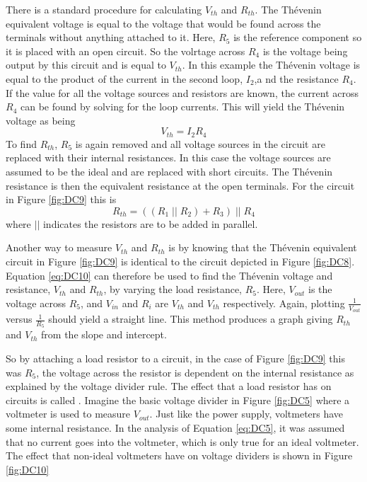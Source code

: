 \documentclass[12pt, a4paper, oneside, openright, titlepage]{book}
\begin{document}
There is a standard procedure for calculating $V_{th}$ and $R_{th}$. The Th\'{e}venin equivalent voltage is equal to the voltage that would be found across the terminals without anything attached to it. Here, $R_5$ is the reference component so it is placed with an open circuit. So the volrtage across $R_4$ is the voltage being output by this circuit and is equal to $V_{th}$. In this example the Th\'{e}venin voltage is equal to the product of the current in the second loop, $I_2$,a nd the resistance $R_4$. If the value for all the voltage sources and resistors are known, the current across $R_4$ can be found by solving for the loop currents. This will yield the Th\'{e}venin voltage as being \begin{equation}\label{eq:DC11}
    V_{th} = I_2R_4
\end{equation}
To find $R_{th}$, $R_5$ is again removed and all voltage sources in the circuit are replaced with their internal resistances. In this case the voltage sources are assumed to be the ideal and are replaced with short circuits. The Th\'{e}venin resistance is then the equivalent resistance at the open terminals. For the circuit in Figure \ref{fig:DC9} this is \begin{equation}\label{eq:DC12}
    R_{th} = ((R_1\;\vert\vert\;R_2)+R_3)\;\vert\vert\;R_4
\end{equation}
where $\vert\vert$ indicates the resistors are to be added in parallel.


\noindent Another way to measure $V_{th}$ and $R_{th}$ is by knowing that the Th\'{e}venin equivalent circuit in Figure \ref{fig:DC9} is identical to the circuit depicted in Figure \ref{fig:DC8}. Equation \ref{eq:DC10} can therefore be used to find the Th\'{e}venin voltage and resistance, $V_{th}$ and $R_{th}$, by varying the load resistance, $R_5$. Here, $V_{out}$ is the voltage across $R_5$, and $V_{in}$ and $R_i$ are $V_{th}$ and $V_{th}$ respectively. Again, plotting $\frac{1}{V_{out}}$ versus $\frac{1}{R_5}$ should yield a straight line. This method produces a graph giving $R_{th}$ and $V_{th}$ from the slope and intercept.


\noindent So by attaching a load resistor to a circuit, in the case of Figure \ref{fig:DC9} this was $R_5$, the voltage across the resistor is dependent on the internal resistance as explained by the voltage divider rule. The effect that a load resistor has on circuits is called . Imagine the basic voltage divider in Figure \ref{fig:DC5} where a voltmeter is used to measure $V_{out}$. Just like the power supply, voltmeters have some internal resistance. In the analysis of Equation \ref{eq:DC5}, it was assumed that no current goes into the voltmeter, which is only true for an ideal voltmeter. The effect that non-ideal voltmeters have on voltage dividers is shown in Figure \ref{fig:DC10}
\end{document}
